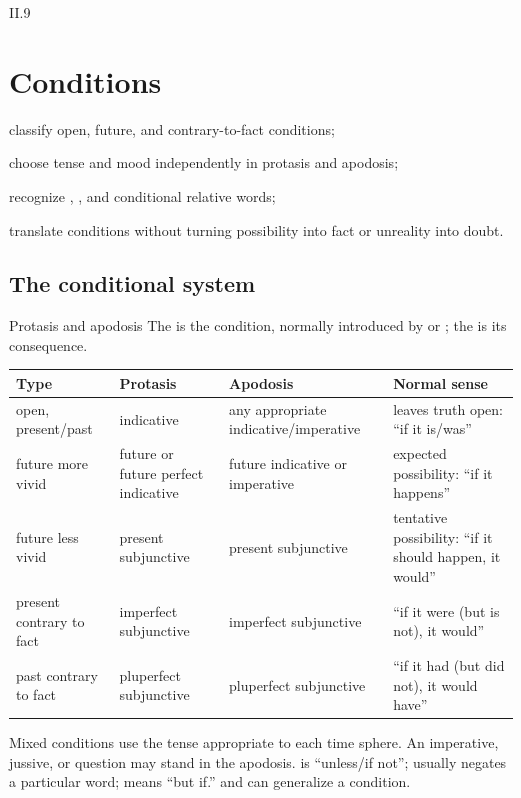 \begin{courseunit}{II.9}
\chapter{Conditions}

\begin{learningobjectives}
  \item classify open, future, and contrary-to-fact conditions;
  \item choose tense and mood independently in protasis and apodosis;
  \item recognize , , and conditional relative words;
  \item translate conditions without turning possibility into fact or unreality into doubt.
\end{learningobjectives}

\section{The conditional system}

\begin{grammarbox}{Protasis and apodosis}
The  is the condition, normally introduced by  or ; the
 is its consequence.

\begin{tabularx}{\linewidth}{@{}P{1.45in}P{1.55in}P{1.55in}Y@{}}
\toprule
\textbf{Type} & \textbf{Protasis} & \textbf{Apodosis} & \textbf{Normal sense}\\ \midrule
open, present/past & indicative & any appropriate indicative/imperative & leaves truth open:
``if it is/was''\\
future more vivid & future or future perfect indicative & future indicative or imperative &
expected possibility: ``if it happens''\\
future less vivid & present subjunctive & present subjunctive & tentative possibility:
``if it should happen, it would''\\
present contrary to fact & imperfect subjunctive & imperfect subjunctive & ``if it were
(but is not), it would''\\
past contrary to fact & pluperfect subjunctive & pluperfect subjunctive & ``if it had
(but did not), it would have''\\
\bottomrule
\end{tabularx}

Mixed conditions use the tense appropriate to each time sphere.  An imperative, jussive, or
question may stand in the apodosis.   is ``unless/if not'';  usually
negates a particular word;  means ``but if.''   and
 can generalize a condition.
\end{grammarbox}


\end{courseunit}
